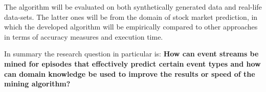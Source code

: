 The algorithm will be evaluated on both synthetically generated data and real-life data-sets. The latter ones will be from the domain of stock market prediction, in which the developed algorithm will be empirically compared to other approaches in terms of accuracy measures and execution time.

In summary the research question in particular is:\newline \newline
\textbf{How can event streams be mined for episodes that effectively predict certain event types and how can domain knowledge be used to improve the results or speed of the mining algorithm?}